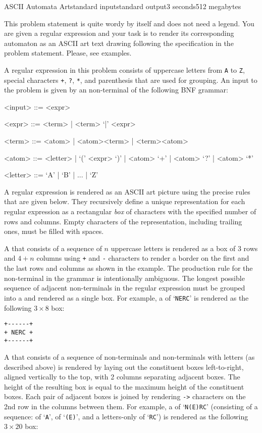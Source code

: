\begin{problem}{ASCII Automata Art}{standard input}{standard output}{3 seconds}{512 megabytes}

This problem statement is quite wordy by itself and does not need a legend. You are given a regular expression and your task is to render its corresponding automaton as an ASCII art text drawing following the specification in the problem statement. Please, see examples.

A regular expression in this problem consists of uppercase letters from \texttt{A} to \texttt{Z}, special characters \texttt{+}, \texttt{?}, \texttt{*}, and parenthesis that are used for grouping. An input to the problem is given by an  non-terminal of the following BNF grammar:

\begin{grammar}
<input> ::= <expr>

<expr> ::= <term> | <term> `|' <expr>

<term> ::= <atom> | <atom><term> | <term><atom>

<atom> ::= <letter> | `(' <expr> `)' | <atom> `+' | <atom> `?' | <atom> `*'

<letter> ::= `A' | `B' | ... | `Z'
\end{grammar}

A regular expression is rendered as an ASCII art picture using the precise rules that are given below. They recursively define a unique representation for each regular expression as a rectangular \emph{box} of characters with the specified number of rows and columns. Empty characters of the representation, including trailing ones, must be filled with spaces.

A  that consists of a sequence of $n$ uppercase letters is rendered as a box of 3 rows and $4 + n$ columns using \texttt{+} and \texttt{-} characters to render a border on the first and the last rows and columns as shown in the example. The production rule for the  non-terminal in the grammar is intentionally ambiguous. The longest possible sequence of adjacent  non-terminals in the regular expression must be grouped into a  and rendered as a single box. 
For example, a  of `\texttt{NERC}' 
is rendered as the following $3 \times 8$ box:

\begin{verbatim}
+------+
+ NERC +
+------+
\end{verbatim}

A  that consists of a sequence of  non-terminals and  non-terminals with letters (as described above) is rendered by laying out the constituent boxes left-to-right, aligned vertically to the top, with 2 columns separating adjacent boxes. The height of the resulting box is equal to the maximum height of the constituent boxes.
Each pair of adjacent boxes is joined by rendering \texttt{->} characters on the 2nd row in the columns between them. 
For example, a  of `\texttt{N(E)RC}' (consisting of a sequence:  of `\texttt{A}',  of `\texttt{(E)}', and a letters-only  of `\texttt{RC}')
is rendered as the following $3 \times 20$ box:


\end{problem}
